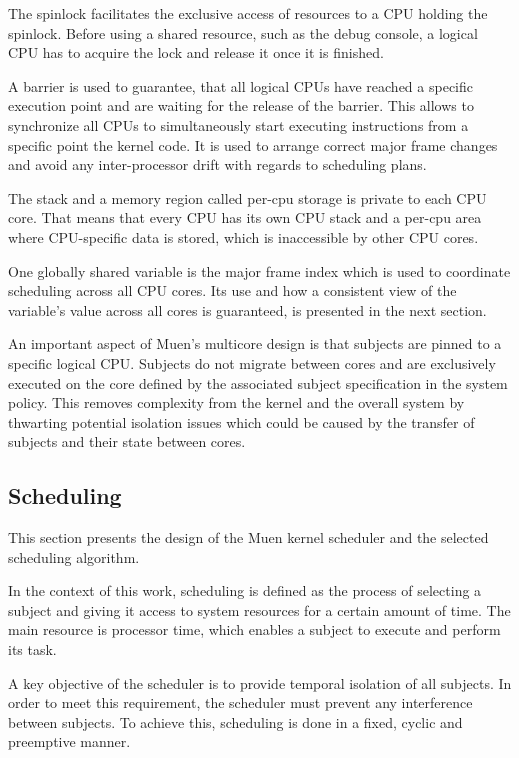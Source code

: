 The spinlock facilitates the exclusive access of resources to a CPU holding the
spinlock. Before using a shared resource, such as the debug console, a logical
CPU has to acquire the lock and release it once it is finished.

A barrier is used to guarantee, that all logical CPUs have reached a specific
execution point and are waiting for the release of the barrier. This allows to
synchronize all CPUs to simultaneously start executing instructions from a
specific point the kernel code. It is used to arrange correct major frame
changes and avoid any inter-processor drift with regards to scheduling plans.

The stack and a memory region called per-cpu storage is private to each CPU
core. That means that every CPU has its own CPU stack and a per-cpu area where
CPU-specific data is stored, which is inaccessible by other CPU cores.

One globally shared variable is the major frame index which is used to
coordinate scheduling across all CPU cores. Its use and how a consistent view of
the variable's value across all cores is guaranteed, is presented in the next
section.

An important aspect of Muen's multicore design is that subjects are pinned to a
specific logical CPU. Subjects do not migrate between cores and are exclusively
executed on the core defined by the associated subject specification in the
system policy. This removes complexity from the kernel and the overall system by
thwarting potential isolation issues which could be caused by the transfer of
subjects and their state between cores.

\subsection{Scheduling}\label{subsec:scheduling}
This section presents the design of the Muen kernel scheduler and the selected
scheduling algorithm.

In the context of this work, scheduling is defined as the process of selecting
a subject and giving it access to system resources for a certain amount of time.
The main resource is processor time, which enables a subject to execute and
perform its task.

A key objective of the scheduler is to provide temporal isolation of all
subjects. In order to meet this requirement, the scheduler must prevent any
interference between subjects. To achieve this, scheduling is done in a fixed,
cyclic and preemptive manner.

